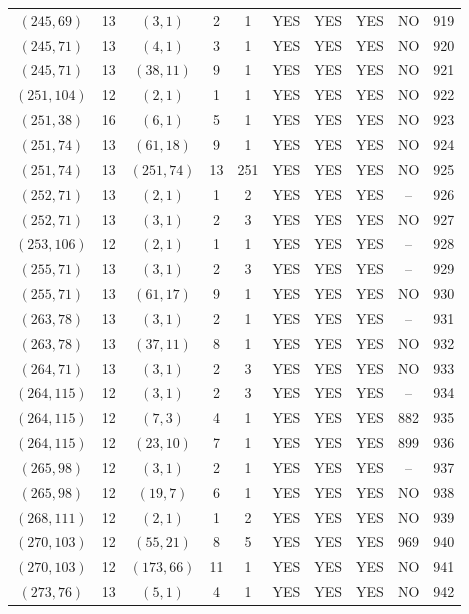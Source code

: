 \begin{longtable}{|c|c|c|c|c|c|c|c|c|c|}
$(245, 69)$ & 13 & $(3, 1)$ & 2 & 1 & YES & YES & YES & NO & 919\\
$(245, 71)$ & 13 & $(4, 1)$ & 3 & 1 & YES & YES & YES & NO & 920\\
$(245, 71)$ & 13 & $(38, 11)$ & 9 & 1 & YES & YES & YES & NO & 921\\
$(251, 104)$ & 12 & $(2, 1)$ & 1 & 1 & YES & YES & YES & NO & 922\\
$(251, 38)$ & 16 & $(6, 1)$ & 5 & 1 & YES & YES & YES & NO & 923\\
$(251, 74)$ & 13 & $(61, 18)$ & 9 & 1 & YES & YES & YES & NO & 924\\
$(251, 74)$ & 13 & $(251, 74)$ & 13 & 251 & YES & YES & YES & NO & 925\\
$(252, 71)$ & 13 & $(2, 1)$ & 1 & 2 & YES & YES & YES & -- & 926\\
$(252, 71)$ & 13 & $(3, 1)$ & 2 & 3 & YES & YES & YES & NO & 927\\
$(253, 106)$ & 12 & $(2, 1)$ & 1 & 1 & YES & YES & YES & -- & 928\\
$(255, 71)$ & 13 & $(3, 1)$ & 2 & 3 & YES & YES & YES & -- & 929\\
$(255, 71)$ & 13 & $(61, 17)$ & 9 & 1 & YES & YES & YES & NO & 930\\
$(263, 78)$ & 13 & $(3, 1)$ & 2 & 1 & YES & YES & YES & -- & 931\\
$(263, 78)$ & 13 & $(37, 11)$ & 8 & 1 & YES & YES & YES & NO & 932\\
$(264, 71)$ & 13 & $(3, 1)$ & 2 & 3 & YES & YES & YES & NO & 933\\
$(264, 115)$ & 12 & $(3, 1)$ & 2 & 3 & YES & YES & YES & -- & 934\\
$(264, 115)$ & 12 & $(7, 3)$ & 4 & 1 & YES & YES & YES & 882 & 935\\
$(264, 115)$ & 12 & $(23, 10)$ & 7 & 1 & YES & YES & YES & 899 & 936\\
$(265, 98)$ & 12 & $(3, 1)$ & 2 & 1 & YES & YES & YES & -- & 937\\
$(265, 98)$ & 12 & $(19, 7)$ & 6 & 1 & YES & YES & YES & NO & 938\\
$(268, 111)$ & 12 & $(2, 1)$ & 1 & 2 & YES & YES & YES & NO & 939\\
$(270, 103)$ & 12 & $(55, 21)$ & 8 & 5 & YES & YES & YES & 969 & 940\\
$(270, 103)$ & 12 & $(173, 66)$ & 11 & 1 & YES & YES & YES & NO & 941\\
$(273, 76)$ & 13 & $(5, 1)$ & 4 & 1 & YES & YES & YES & NO & 942\\

\end{longtable}
